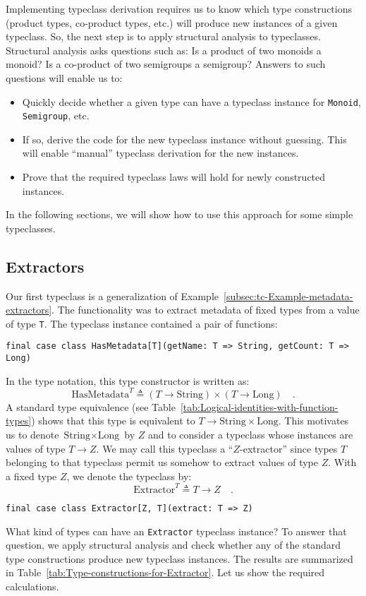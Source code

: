 Implementing typeclass derivation requires us to know which type constructions
(product types, co-product types, etc.) will produce new instances
of a given typeclass. So, the next step is to apply 
structural analysis to typeclasses. Structural analysis asks questions
such as: Is a product of two monoids a monoid? Is a co-product of
two semigroups a semigroup? Answers to such questions will enable
us to:
\begin{itemize}
\item Quickly decide whether a given type can have a typeclass instance
for \lstinline!Monoid!, \lstinline!Semigroup!, etc.
\item If so, derive the code for the new typeclass instance without guessing.
This will enable \textsf{``}manual\textsf{''} typeclass derivation for the new instances.
\item Prove that the required typeclass laws will hold for newly constructed
instances.
\end{itemize}
In the following sections, we will show how to use this approach for
some simple typeclasses.

\subsection{Extractors\label{subsec:Extractors-typeclasses}}

Our first typeclass is a generalization of Example~\ref{subsec:tc-Example-metadata-extractors}.
The functionality was to extract metadata of fixed types from a value
of type \lstinline!T!. The typeclass instance contained a pair of
functions:
\begin{lstlisting}
final case class HasMetadata[T](getName: T => String, getCount: T => Long)
\end{lstlisting}
In the type notation, this type constructor is written as:
\[
\text{HasMetadata}^{T}\triangleq(T\rightarrow\text{String})\times(T\rightarrow\text{Long})\quad.
\]
A standard type equivalence (see Table~\ref{tab:Logical-identities-with-function-types})
shows that this type is equivalent to $T\rightarrow\text{String}\times\text{Long}$.
This motivates us to denote $\text{String}\times\text{Long}$ by $Z$
and to consider a typeclass whose instances are values of type $T\rightarrow Z$.
We may call this typeclass a \textsf{``}$Z$-extractor\textsf{''}
since types $T$ belonging to that typeclass permit us somehow to
extract values of type $Z$. With a fixed type $Z$, we denote the
typeclass by:
\[
\text{Extractor}^{T}\triangleq T\rightarrow Z\quad.
\]
\begin{lstlisting}
final case class Extractor[Z, T](extract: T => Z)
\end{lstlisting}
What kind of types can have an \lstinline!Extractor! typeclass instance?
To answer that question, we apply structural analysis and check whether
any of the standard type constructions produce new typeclass instances.
The results are summarized in Table~\ref{tab:Type-constructions-for-Extractor}.
Let us show the required calculations.

